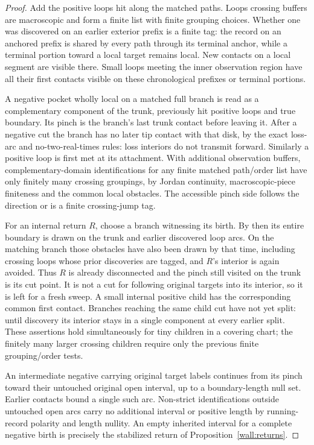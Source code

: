 \begin{proof}
Add the positive loops hit along the matched paths.  Loops crossing buffers are macroscopic and form a finite list with finite grouping choices.  Whether one was discovered on an earlier exterior prefix is a finite tag: the record on an anchored prefix is shared by every path through its terminal anchor, while a terminal portion toward a local target remains local.  New contacts on a local segment are visible there.  Small loops meeting the inner observation region have all their first contacts visible on these chronological prefixes or terminal portions.

A negative pocket wholly local on a matched full branch is read as a complementary component of the trunk, previously hit positive loops and true boundary.  Its pinch is the branch's last trunk contact before leaving it.  After a negative cut the branch has no later tip contact with that disk, by the exact loss-arc and no-two-real-times rules: loss interiors do not transmit forward.  Similarly a positive loop is first met at its attachment.  With additional observation buffers, complementary-domain identifications for any finite matched path/order list have only finitely many crossing groupings, by Jordan continuity, macroscopic-piece finiteness and the common local obstacles.  The accessible pinch side follows the direction or is a finite crossing-jump tag.

For an internal return $R$, choose a branch witnessing its birth.  By then its entire boundary is drawn on the trunk and earlier discovered loop arcs.  On the matching branch those obstacles have also been drawn by that time, including crossing loops whose prior discoveries are tagged, and $R$'s interior is again avoided.  Thus $R$ is already disconnected and the pinch still visited on the trunk is its cut point.  It is not a cut for following original targets into its interior, so it is left for a fresh sweep.  A small internal positive child has the corresponding common first contact.  Branches reaching the same child cut have not yet split: until discovery its interior stays in a single component at every earlier split.  These assertions hold simultaneously for tiny children in a covering chart; the finitely many larger crossing children require only the previous finite grouping/order tests.

An intermediate negative carrying original target labels continues from its pinch toward their untouched original open interval, up to a boundary-length null set.  Earlier contacts bound a single such arc.  Non-strict identifications outside untouched open arcs carry no additional interval or positive length by running-record polarity and length nullity.  An empty inherited interval for a complete negative birth is precisely the stabilized return of Proposition~\ref{wall:returns}.


\end{proof}
